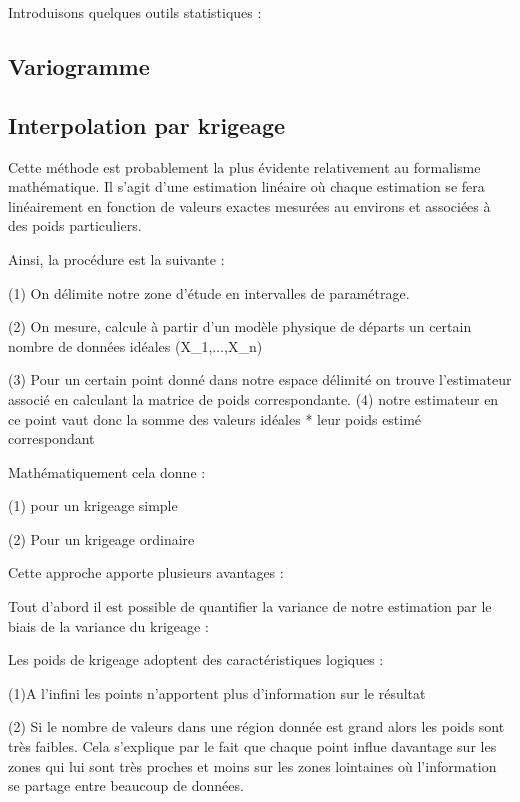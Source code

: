\documentclass[hidelinks,12pt]{article}
\begin{document}
Introduisons quelques outils statistiques :

\subsection{Variogramme}





\subsection{Interpolation par krigeage}

Cette méthode est probablement la plus évidente relativement au formalisme mathématique. Il s'agit d'une estimation linéaire où chaque estimation se fera linéairement en fonction de valeurs exactes mesurées au environs et associées à des poids particuliers.

Ainsi, la procédure est la suivante :

(1) On délimite notre zone d'étude en intervalles de paramétrage.

(2) On mesure, calcule à partir d'un modèle physique de départs un certain nombre de données idéales (X_1,$\ldots$,X_n)

(3) Pour un certain point donné dans notre espace délimité on trouve l'estimateur associé en calculant la matrice de poids correspondante.
(4) notre estimateur en ce point vaut donc la somme des valeurs idéales * leur poids estimé correspondant

Mathématiquement cela donne :

(1) pour un krigeage simple




(2) Pour un krigeage ordinaire

Cette approche apporte plusieurs avantages :


Tout d'abord il est possible de quantifier la variance de notre estimation par le biais de la variance du krigeage :



Les poids de krigeage adoptent des caractéristiques logiques :

(1)A l'infini les points n'apportent plus d'information sur le résultat

(2) Si le nombre de valeurs dans une région donnée est grand alors les poids sont très faibles. Cela s'explique par le fait que chaque point influe davantage sur les zones qui lui sont très proches et moins sur les zones lointaines où l'information se partage entre beaucoup de données.
\end{document}
